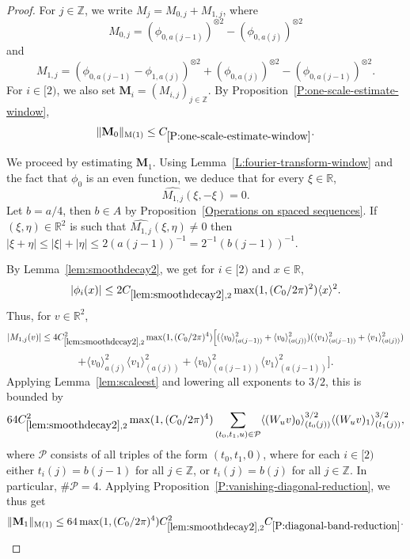 \documentclass[12pt,reqno]{amsart}
\theoremstyle{plain}
\numberwithin{equation}{section}
\theoremstyle{remark}
\newcommand{\Z}{{\mathbb Z}}
\newcommand{\R}{{\mathbb R}}
\begin{document}
\begin{proof}
For $j\in \Z$, we write $M_j=M_{0,j}+M_{1,j}$, where
\[
M_{0,j}= ({\phi}_{0,a(j-1)})^{\otimes 2} -({\phi}_{0,a(j)})^{\otimes 2}
\]
and
\[
M_{1,j}=({\phi}_{0,a(j-1)}-{\phi}_{1,a(j)})^{\otimes 2} + ({\phi}_{0,a(j)})^{\otimes 2} -({\phi}_{0,a(j-1)})^{\otimes 2}.
\]
For $i\in [2)$, we also set $\mathbf{M}_i=(M_{i,j})_{j\in \Z}$. By Proposition~\ref{P:one-scale-estimate-window},
\[
\|\mathbf{M}_0\|_{\rm M(1)} \leq C_{\ref{P:one-scale-estimate-window}}.
\]

We proceed by estimating $\mathbf{M}_1$.
Using Lemma~\ref{L:fourier-transform-window} and the fact that $\phi_0$ is an even function, we deduce that for every $\xi \in \R$,
\[
\widehat{M_{1,j}}(\xi,-\xi)=0.
\]
Let $b=a/4$, then $b\in A$ by Proposition~\ref{Operations on spaced sequences}.
If $(\xi,\eta) \in \R^2$ is such that $\widehat{M_{1,j}}(\xi,\eta) \neq 0$ then $|\xi+\eta| \leq |\xi|+|\eta| \leq 2(a(j-1))^{-1}=2^{-1} (b(j-1))^{-1}$.

By Lemma~\ref{lem:smoothdecay2}, we get for $i\in [2)$ and $x\in \R$,
\[
|\phi_i(x)| \leq 2 C_{\ref{lem:smoothdecay2},2} \max(1,(C_0/2\pi)^2) \langle x \rangle^2.
\]
Thus, for $v\in \R^2$,
\[
|M_{1,j}(v)|
\leq 4 C_{\ref{lem:smoothdecay2},2}^2 \max(1,(C_0/2\pi)^4)\Big[
(\langle v_0 \rangle^2_{(a(j-1))}+\langle v_0 \rangle^2_{(a(j))})
(\langle v_1 \rangle^2_{(a(j-1))}+\langle v_1 \rangle^2_{(a(j))})
\]
\[
+\langle v_0 \rangle^2_{a(j)} \langle v_1 \rangle^2_{(a(j))}+\langle v_0 \rangle^2_{(a(j-1))} \langle v_1 \rangle^2_{(a(j-1))} \Big].
\]
Applying Lemma~\ref{lem:scaleest} and lowering all exponents to $3/2$, this is bounded by
\[
64 C_{\ref{lem:smoothdecay2},2}^2 \max(1,(C_0/2\pi)^4)
\sum_{(t_0,t_1,u) \in \mathcal P} \langle (W_u v)_0 \rangle^{3/2}_{(t_0(j))} \langle (W_u v)_1 \rangle^{3/2}_{(t_1(j))},
\]
where $\mathcal P$ consists of all triples of the form $(t_0,t_1,0)$, where for each $i\in [2)$ either $t_i(j)=b(j-1)$ for all $j\in \Z$, or $t_i(j)=b(j)$ for all $j\in \Z$. In particular, $\# \mathcal P=4$. Applying Proposition~\ref{P:vanishing-diagonal-reduction}, we thus get
\[
\|\mathbf{M}_1\|_{\rm M(1)} \leq 64 \max(1,(C_0/2\pi)^4) C_{\ref{lem:smoothdecay2},2}^2C_{\ref{P:diagonal-band-reduction}}.
\]
\end{proof}
\end{document}
